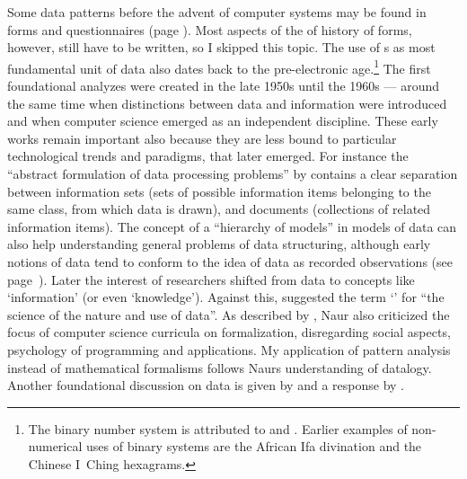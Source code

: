 Some data patterns before the advent of computer systems may be found in forms
and questionnaires (page \pageref{sec:forms}). Most aspects of the of history
of forms, however, still have to be written, so I skipped this topic.  The use
of s as most fundamental unit of data also dates back to the
pre-electronic age.\footnote{The binary number system is attributed to
\textcite{Leibniz1703} and \textcite{Boole1854}. Earlier examples of
non-numerical uses of binary systems are the African Ifa divination and the
Chinese I~Ching hexagrams.} The first foundational analyzes were created in the
late 1950s until the 1960s --- around the same time when distinctions between
data and information were introduced \cite{Gray2003} and when computer science
emerged as an independent discipline. These early works remain important also
because they are less bound to particular technological trends and paradigms,
that later emerged. For instance the ``abstract formulation of data processing
problems'' by \textcite{Young1958} contains a clear separation between
information sets (sets of possible information items belonging to the same
class, from which data is drawn), and documents (collections of related
information items). The concept of a ``hierarchy of models'' in models of data 
\cite{Suppes1962} can also help understanding general problems of data
structuring, although early notions of data tend to conform to the idea of data
as recorded observations (see page~\pageref{sec:philofdata}). Later the
interest of researchers shifted from data to concepts like `information' (or
even `knowledge'). Against this, \textcite{Naur1966,Naur1968} suggested the
term `' for ``the science of the nature and use of data''. As
described by \textcite{Sveinsdottir1988}, Naur also criticized the focus of
computer science curricula on formalization, disregarding social aspects,
psychology of programming and applications. My application of pattern analysis
instead of mathematical formalisms follows Naurs understanding of datalogy.
Another foundational discussion on data is given by \textcite{Mealy1967} and a
response by \textcite{Chapin1968}. 

